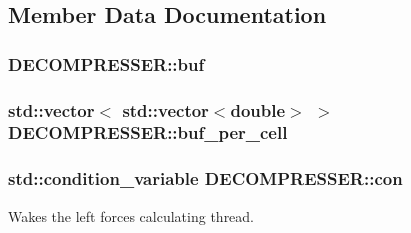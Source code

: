 \subsection{Member Data Documentation}
\hypertarget{class_d_e_c_o_m_p_r_e_s_s_e_r_a58ccbfc79c1a69cc6947ad3dca223b56}{
\subsubsection[{buf}]{ D\-E\-C\-O\-M\-P\-R\-E\-S\-S\-E\-R\-::buf\hspace{0.3cm}{\ttfamily [private]}}}\label{class_d_e_c_o_m_p_r_e_s_s_e_r_a58ccbfc79c1a69cc6947ad3dca223b56}
\hypertarget{class_d_e_c_o_m_p_r_e_s_s_e_r_a22a44231bf30be0dcc70e69997060229}{
\subsubsection[{buf\-\_\-per\-\_\-cell}]{\setlength{\rightskip}{0pt plus 5cm}std\-::vector$<$ std\-::vector$<$double$>$ $>$ D\-E\-C\-O\-M\-P\-R\-E\-S\-S\-E\-R\-::buf\-\_\-per\-\_\-cell\hspace{0.3cm}{\ttfamily [private]}}}\label{class_d_e_c_o_m_p_r_e_s_s_e_r_a22a44231bf30be0dcc70e69997060229}
\hypertarget{class_d_e_c_o_m_p_r_e_s_s_e_r_af32f59832855fe170d0648df9a796ab7}{
\subsubsection[{con}]{\setlength{\rightskip}{0pt plus 5cm}std\-::condition\-\_\-variable D\-E\-C\-O\-M\-P\-R\-E\-S\-S\-E\-R\-::con\hspace{0.3cm}{\ttfamily [private]}}}\label{class_d_e_c_o_m_p_r_e_s_s_e_r_af32f59832855fe170d0648df9a796ab7}


Wakes the left forces calculating thread. 

